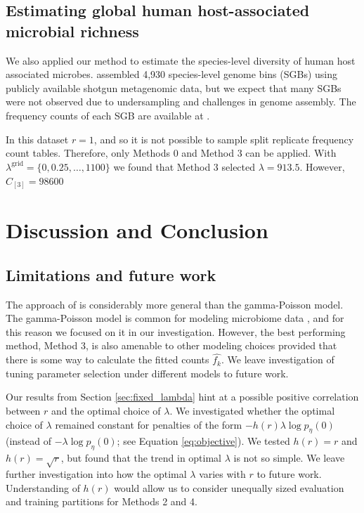 \documentclass[12pt]{article}
\newcommand{\lambdagrid}{\lambda^{\text{grid}}}
\theoremstyle{break}
\theoremstyle{break}
\begin{document}


\subsection{Estimating global human host-associated microbial richness}

We also applied our method to estimate the species-level diversity of human host associated microbes.
\cite{pasolli2019extensive} assembled 4,930 species-level genome bins (SGBs) using publicly available shotgun metagenomic data, but we expect that many SGBs were not observed due to undersampling and challenges in genome assembly. The frequency counts of each SGB are available at \cite[Table S4]{pasolli2019extensive}.

In this dataset $r=1$, and so it is not possible to sample split replicate frequency count tables. Therefore, only Methods 0 and Method 3 can be applied. With $\lambdagrid = \{0, 0.25, \ldots, 1100\}$ we found that Method 3 selected $\lambda = 913.5$. However, $\widehat{C}_{[3]} = 98600$

\section{Discussion and Conclusion}
\label{sec:discussion}

\subsection{Limitations and future work}

The approach of \citet{wang_2005} is considerably more general than the gamma-Poisson model.  The gamma-Poisson model is common for modeling microbiome data \citep{deseq2,mcmurdie2013phyloseq}, and for this reason we focused on it in our investigation. However, the best performing method, Method 3, is also amenable to other modeling choices provided that there is some way to calculate the fitted counts $\widehat{f_k}$. We leave investigation of tuning parameter selection under different models to future work.

Our results from Section \ref{sec:fixed_lambda} hint at a possible positive correlation between $r$ and the optimal choice of $\lambda$. We investigated whether the optimal choice of $\lambda$ remained constant for penalties of the form $-h(r)\lambda \log p_{\eta}(0)$ (instead of $-\lambda \log p_{\eta}(0)$; see Equation \eqref{eq:objective}).
We tested $h(r) = r$ and $h(r) = \sqrt{r}$, but found that the trend in optimal $\lambda$ is not so simple. We leave further investigation into how the optimal $\lambda$ varies with $r$ to future work. Understanding of $h(r)$ would allow us to consider unequally sized evaluation and training partitions for Methods 2 and 4.
\end{document}

